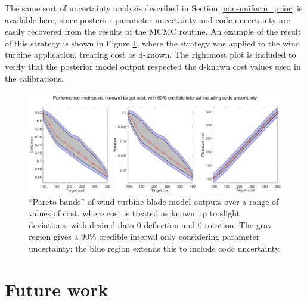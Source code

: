 \documentclass{article}
\begin{document}
The same sort of uncertainty analysis described in Section \ref{non-uniform_prior} is available here, since posterior parameter uncertainty and code uncertainty are easily recovered from the results of the MCMC routine. An example of the result of this strategy is shown in Figure \ref{fig:known_cost}, where the strategy was applied to the wind turbine application, treating cost as d-known. The rightmost plot is included to verify that the posterior model output respected the d-known cost values used in the calibrations.

\begin{figure}
\centering
\includegraphics[width=.9\linewidth]{FIG_costs_code_uncert}
\captionsetup{width=.9\linewidth}
\caption{``Pareto bands'' of wind turbine blade model outputs over a range of values of cost, where cost is treated as known up to slight deviations, with desired data 0 deflection and 0 rotation. The gray region gives a 90\% credible interval only considering parameter uncertainty; the blue region extends this to include code uncertainty.}
\label{fig:known_cost}
\end{figure}





\section{Future work}
\end{document}
